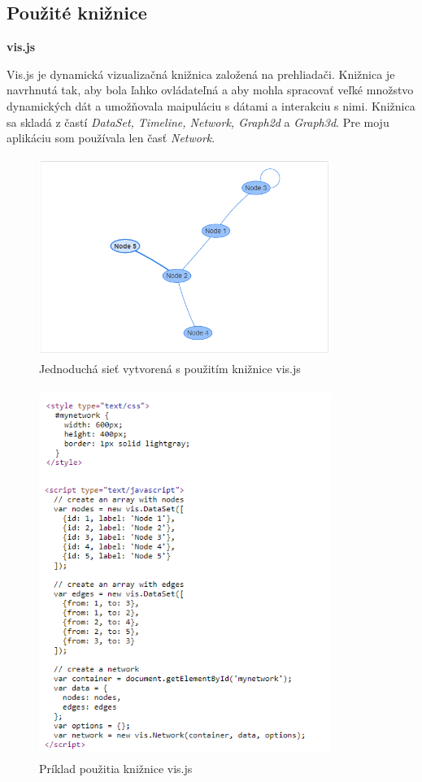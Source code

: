 \documentclass[slovak,master,public,dept460,male,cpdeclaration,oneside]{diploma}
\begin{document}
\subsection{Použité knižnice}


\textbf{vis.js}


\noindent Vis.js je dynamická vizualizačná knižnica založená na prehliadači. Knižnica je navrhnutá tak, aby bola ľahko ovládateľná a aby mohla spracovať veľké množstvo dynamických dát a umožňovala maipuláciu s dátami a interakciu s nimi. Knižnica sa skladá z častí \textit{DataSet, Timeline, Network, Graph2d} a \textit{Graph3d}.
Pre moju aplikáciu som používala len časť \textit{Network}.

\begin{figure}[H]
\centering
\includegraphics[width=9.5cm, height=6.5cm]{figures/vis_basic_usage}
\caption{Jednoduchá sieť vytvorená s použitím knižnice vis.js}
\end{figure}


\begin{figure}[H]
\centering
\includegraphics[width=9.5cm, height=12cm]{figures/vis_basiccode}
\caption{Príklad použitia knižnice vis.js}
\end{figure}
\end{document}
